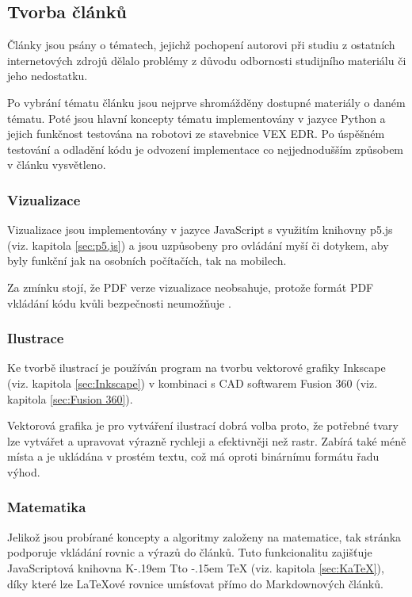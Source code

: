 \documentclass[a4paper, 12pt]{article}
\makeatletter
\DeclareRobustCommand{\KaTeX}{%
  K\kern -.19em
  {\sbox \z@ T\vbox to\ht \z@ {\hbox{%
  \check@mathfonts
  \fontsize\sf@size\z@
  \selectfont A}%
  \vss}%
}\kern -.15em
\TeX}
\makeatother
\begin{document}
  \subsection{Tvorba článků} \label{sec:Tvorba článků}
  Články jsou psány o tématech, jejichž pochopení autorovi při studiu z ostatních internetových zdrojů dělalo problémy z důvodu odbornosti studijního materiálu či jeho nedostatku.

  Po vybrání tématu článku jsou nejprve shromážděny dostupné materiály o daném tématu. Poté jsou hlavní koncepty tématu implementovány v jazyce Python a jejich funkčnost testována na robotovi ze stavebnice VEX EDR. Po úspěšném testování a odladění kódu je odvození implementace co nejjednodušším způsobem v článku vysvětleno.


  \subsubsection{Vizualizace} \label{sec:Vizualizace}
  Vizualizace jsou implementovány v jazyce JavaScript s využitím knihovny p5.js (viz. kapitola \ref{sec:p5.js}) a jsou uzpůsobeny pro ovládání myší či dotykem, aby byly funkční jak na osobních počítačích, tak na mobilech.

  Za zmínku stojí, že PDF verze vizualizace neobsahuje, protože formát PDF vkládání kódu kvůli bezpečnosti neumožňuje \cite{history-of-pdf}.


  \subsubsection{Ilustrace} \label{sec:Ilustrace}
  Ke tvorbě ilustrací je používán program na tvorbu vektorové grafiky Inkscape (viz. kapitola \ref{sec:Inkscape}) v kombinaci s CAD softwarem Fusion 360 (viz. kapitola \ref{sec:Fusion 360}).

  Vektorová grafika je pro vytváření ilustrací dobrá volba proto, že potřebné tvary lze vytvářet a upravovat výrazně rychleji a efektivněji než rastr. Zabírá také méně místa a je ukládána v prostém textu, což má oproti binárnímu formátu řadu výhod.


  \subsubsection{Matematika} \label{sec:Matematika}
  Jelikož jsou probírané koncepty a algoritmy založeny na matematice, tak stránka podporuje vkládání rovnic a výrazů do článků. Tuto funkcionalitu zajišťuje JavaScriptová knihovna \KaTeX{} (viz. kapitola \ref{sec:KaTeX}), díky které lze \LaTeX ové rovnice umísťovat přímo do Markdownových článků.
\end{document}
